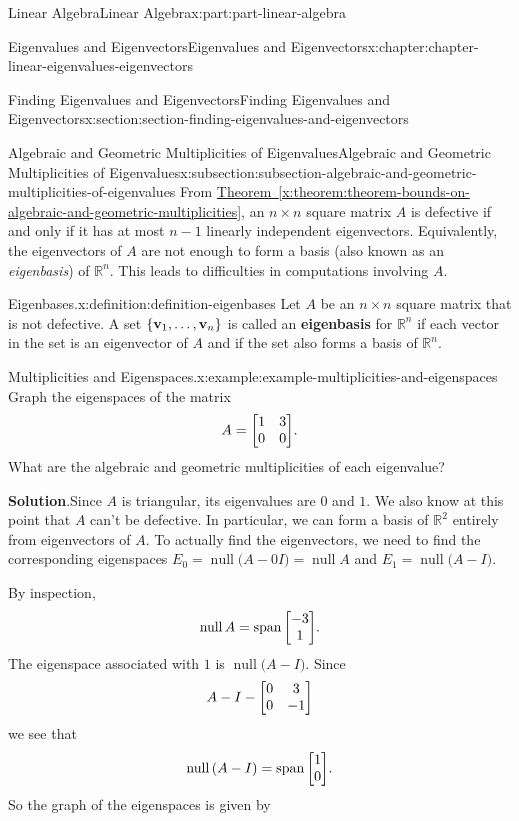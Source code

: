 \documentclass[twoside,10pt,]{book}
\newcommand{\blocktitlefont}{\relax}
\newcommand{\xreffont}{\relax}
\newcommand{\terminology}[1]{\textbf{#1}}
\numberwithin{equation}{part}
\newcommand{\RR}{\mathbb{R}}
\providecommand{\vb}[1]{\mathbf{#1}}
\newcommand{\nul}[1]{\operatorname{null}{#1}}
\newcommand{\spn}[1]{\operatorname{span}{#1}}
\begin{document}
\begin{partptx}{Linear Algebra}{}{Linear Algebra}{}{}{x:part:part-linear-algebra}
\begin{chapterptx}{Eigenvalues and Eigenvectors}{}{Eigenvalues and Eigenvectors}{}{}{x:chapter:chapter-linear-eigenvalues-eigenvectors}
\begin{sectionptx}{Finding Eigenvalues and Eigenvectors}{}{Finding Eigenvalues and Eigenvectors}{}{}{x:section:section-finding-eigenvalues-and-eigenvectors}
\begin{subsectionptx}{Algebraic and Geometric Multiplicities of Eigenvalues}{}{Algebraic and Geometric Multiplicities of Eigenvalues}{}{}{x:subsection:subsection-algebraic-and-geometric-multiplicities-of-eigenvalues}
From \hyperref[x:theorem:theorem-bounds-on-algebraic-and-geometric-multiplicities]{Theorem~{\xreffont\ref{x:theorem:theorem-bounds-on-algebraic-and-geometric-multiplicities}}}, an \(n\times n\) square matrix \(A\) is defective if and only if it has at most \(n-1\) linearly independent eigenvectors. Equivalently, the eigenvectors of \(A\) are not enough to form a basis (also known as an \emph{eigenbasis}) of \(\RR^n\). This leads to difficulties in computations involving \(A\).%
\begin{definition}{Eigenbases.}{x:definition:definition-eigenbases}%
%
Let \(A\) be an \(n\times n\) square matrix that is not defective. A set \(\qty{\vb{v}_1, \ldots, \vb{v}_n}\) is called an \terminology{eigenbasis} for \(\RR^n\) if each vector in the set is an eigenvector of \(A\) and if the set also forms a basis of \(\RR^n\).%
\end{definition}
\begin{example}{Multiplicities and Eigenspaces.}{x:example:example-multiplicities-and-eigenspaces}%
Graph the eigenspaces of the matrix%
\begin{equation*}
A = \mqty[1 & 3 \\ 0 & 0].
\end{equation*}
What are the algebraic and geometric multiplicities of each eigenvalue?%
\par\smallskip%
\noindent\textbf{\blocktitlefont Solution}.\hypertarget{g:solution:idm1630814520}{}\quad{}Since \(A\) is triangular, its eigenvalues are \(0\) and \(1\). We also know at this point that \(A\) can't be defective. In particular, we can form a basis of \(\RR^2\) entirely from eigenvectors of \(A\). To actually find the eigenvectors, we need to find the corresponding eigenspaces \(E_{0} = \nul(A-0I) = \nul A\) and \(E_{1} = \nul(A-I)\).%
\par
By inspection,%
\begin{equation*}
\nul A = \spn{\mqty[-3 \\ 1]}.
\end{equation*}
The eigenspace associated with \(1\) is \(\nul(A-I)\). Since%
\begin{equation*}
A- I - \mqty[0 & 3 \\ 0 & -1]
\end{equation*}
we see that%
\begin{equation*}
\nul(A-I) = \spn{\mqty[1\\0]}.
\end{equation*}
So the graph of the eigenspaces is given by%

\end{example}
\end{subsectionptx}
\end{sectionptx}
\end{chapterptx}
\end{partptx}
\end{document}

